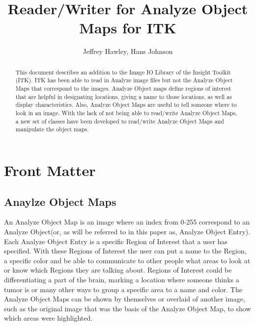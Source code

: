 \documentclass{InsightArticle}
\title{Reader/Writer for Analyze Object Maps for ITK}
\author{Jeffrey Hawley, Hans Johnson }
\begin{document}
\ifpdf
\else
\fi


\maketitle


\ifhtml
\chapter*{Front Matter\label{front}}
\fi


\begin{abstract}
\noindent
This document describes an addition to the Image IO Library of the Insight Toolkit (ITK).
ITK has been able to read in Analyze image files but not the Analyze Object Maps that correspond
to the images.  Analyze Object maps define regions of interest that are helpful in designating locations, giving a name to those
locations, as well as display characteristics.  Also, Analyze Object Maps are useful to tell
someone where to look in an image.  With the lack of not being able to read/write Analyze Object Maps, a new set of classes have been
developed to read/write Analyze Object Maps and manipulate the object maps.
\end{abstract}

\tableofcontents

\section{Anaylze Object Maps}
An Analyze Object Map is an image where an index from 0-255 correspond to an Analyze Object(or, as will be referred to in this paper as, Analyze Object Entry).  Each Analyze Object Entry
is a specific Region of Interest that a user has specified. With these Regions of Interest the user can put a name to the Region, a specific color and be able to communicate to other people what areas to look at or know which Regions they are talking about.  Regions of Interest could be differentiating a part of the brain, marking a location where someone thinks a tumor is or many other ways to group a specific area to a name and color.  The Analyze Object Maps can be shown by themselves or overlaid of another image, such as the original image that was the basis of the Analyze Object Map, to show which areas were highlighted.
\end{document}
